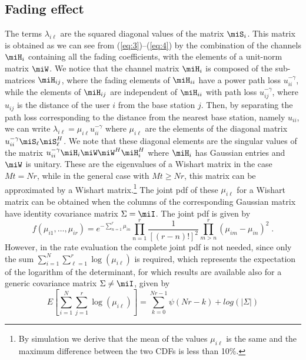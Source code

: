 \subsection{Fading effect}\label{lambda_ij}

The terms $\lambda_{i\ell}$ are the squared diagonal values of the matrix $\miS_i$. This matrix is obtained as
we can see from (\ref{eq:3})--(\ref{eq:4}) by the combination of the 
channels $\miH_{i}$ containing all the fading coefficients, with the elements of a unit-norm matrix $\miW$.
We notice that the channel matrix $\miH_{i}$ is composed of the sub-matrices $\miH_{ij}$, where the fading elements of $\miH_{ii}$ have a power path loss $u_{ii}^{-\gamma}$, while the elements of $\miH_{ij}$ are independent of $\miH_{ii}$ with path loss $u_{ij}^{-\gamma}$, where $u_{ij}$ is the distance of the user $i$ from the base station $j$.
Then, by separating the path loss corresponding to the distance from the nearest base station, namely $u_{ii}$, we can write $\lambda_{i\ell}=\mu_{i\ell}u_{ii}^{-\gamma}$ where $\mu_{i\ell}$ are the elements of the diagonal matrix $u_{ii}^{-\gamma}\miS_\ell\miS_\ell^H$.
We note that these diagonal elements are the singular values of the matrix $u_{ii}^{-\gamma} \miH_i\miW \miW^H \miH_i^H$ where $\miH_i$ has Gaussian entries and $\miW$ is unitary.
These are the eigenvalues of a Wishart matrix in the case $Mt=Nr$, while in the general case with $Mt\geq Nr$, 
this matrix can be approximated by a Wishart matrix.\footnote{By simulation we derive that the mean of the values $\mu_{i\ell}$ is the same and the maximum difference between the two CDFs is less than 10\%.}
The joint pdf of these $\mu_{i\ell}$ for a Wishart matrix can be obtained when
the columns of the corresponding Gaussian matrix have identity covariance matrix $\Sigma=\miI$. The joint pdf is given by \cite{tulino04}
\begin{equation}
    f\left(\mu_{i1}, \ldots, \mu_{ir}\right) =e^{-\sum_{n=1}^{r}\mu_{in}}\prod_{n=1}^{r} \frac{1}{\left[(r-n)!\right]^2}\prod_{m>n}^{r} \left(\mu_{im}-\mu_{in}\right)^2\;.
\end{equation}
However, in the rate evaluation the complete joint pdf is not needed, since only the sum $\sum_{i=1}^N \sum_{\ell=1}^r\log(\mu_{i\ell})$ is required, which represents the expectation of the logarithm of the determinant, for which results are available also for a generic covariance matrix $\Sigma\neq\miI$,
given by \cite{tulino04}
\begin{equation}
	E[\sum_{i=1}^N \sum_{j=1}^r\log(\mu_{i\ell})] = \sum_{k=0}^{Nr-1}\psi(Nr-k) + log (|\Sigma|)\label{suma_log_lambda}
\end{equation}
